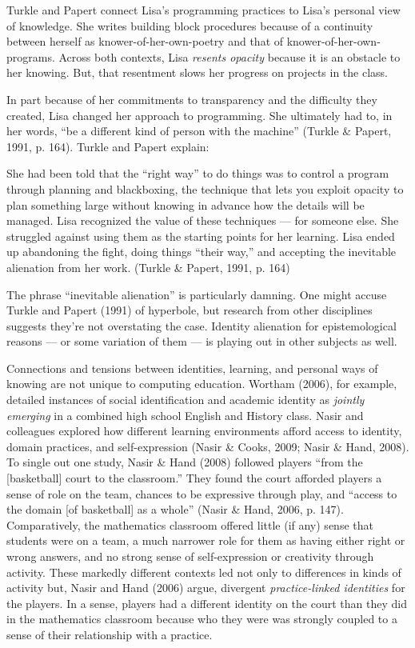 Turkle and Papert connect Lisa's programming practices to Lisa's
personal view of knowledge. She writes building block procedures because
of a continuity between herself as knower-of-her-own-poetry and that of
knower-of-her-own-programs. Across both contexts, Lisa \emph{resents
opacity} because it is an obstacle to her knowing. But, that resentment
slows her progress on projects in the class.

In part because of her commitments to transparency and the difficulty
they created, Lisa changed her approach to programming. She ultimately
had to, in her words, ``be a different kind of person with the machine''
(Turkle \& Papert, 1991, p. 164). Turkle and Papert explain:

She had been told that the ``right way'' to do things was to control a
program through planning and black­boxing, the technique that lets you
exploit opacity to plan something large without knowing in advance how
the details will be managed. Lisa recognized the value of these
techniques --- for someone else. She struggled against using them as the
starting points for her learning. Lisa ended up abandoning the fight,
doing things ``their way,'' and accepting the inevitable alienation from
her work. (Turkle \& Papert, 1991, p. 164)

The phrase ``inevitable alienation'' is particularly damning. One might
accuse Turkle and Papert (1991) of hyperbole, but research from other
disciplines suggests they're not overstating the case. Identity
alienation for epistemological reasons --- or some variation of them ---
is playing out in other subjects as well.

Connections and tensions between identities, learning, and personal ways
of knowing are not unique to computing education. Wortham (2006), for
example, detailed instances of social identification and academic
identity as \emph{jointly emerging} in a combined high school English
and History class. Nasir and colleagues explored how different learning
environments afford access to identity, domain practices, and
self-expression (Nasir \& Cooks, 2009; Nasir \& Hand, 2008). To single
out one study, Nasir \& Hand (2008) followed players ``from the
{[}basketball{]} court to the classroom.'' They found the court afforded
players a sense of role on the team, chances to be expressive through
play, and ``access to the domain {[}of basketball{]} as a whole'' (Nasir
\& Hand, 2006, p. 147). Comparatively, the mathematics classroom offered
little (if any) sense that students were on a team, a much narrower role
for them as having either right or wrong answers, and no strong sense of
self-expression or creativity through activity. These markedly different
contexts led not only to differences in kinds of activity but, Nasir and
Hand (2006) argue, divergent \emph{practice-linked identities} for the
players. In a sense, players had a different identity on the court than
they did in the mathematics classroom because who they were was strongly
coupled to a sense of their relationship with a practice.

